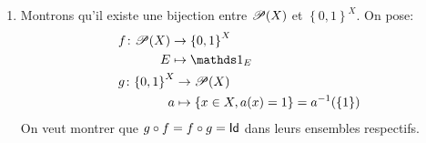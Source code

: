 {\begin{nntd-sol}[]
\begin{enumerate}
\begin{itemize}
                \item On utilise les lois de De Morgan pour simplifier les calculs:
                \begin{equation*}
                    \begin{aligned}
                        \one_{A\cup B} 
                        &= \one_{{\left({(A\cup B)}^{\color{red} C\color{black}}\right)}^{\color{red} C\color{black}}}\\
                        &= 1 - \one_{\comp{\left(A\cup B\right)}}\\
                        &= 1 - \one_{\comp A\cap\comp B}\\
                        &= 1 - \left(1 - \one_A\right)\left(1-\one_B\right)\\
                        &= 1 - \left(1 - \one_A - \one_B + \one_A\one_B\right)\\
                        &= \one_A + \one_B - \one_A\one_B
                    \end{aligned}
                \end{equation*}
            \end{itemize}

            \item Montrons qu'il existe une bijection entre \(\mathscr{P}(X)\) et \({\left\{0,1\right\}}^X\). On pose:
            \begin{equation*}
                \begin{aligned}
                    &\begin{aligned}
                        f\colon \scrP(X)
                        &\to {\left\{0,1\right\}}^X\\
                        E&\mapsto \one_E
                    \end{aligned}\\
                    &\begin{aligned}
                        g\colon{\left\{0,1\right\}}^X
                        &\to \scrP(X)\\
                        a&\mapsto \left\{x\in X,a(x)=1\right\}=a^{-1}(\{1\})
                    \end{aligned}
                \end{aligned}
            \end{equation*}
            On veut montrer que \(g\circ f=f\circ g = \operatorname{\mathsf{Id}}\) dans leurs ensembles respectifs.


\end{enumerate}
\end{nntd-sol}}
